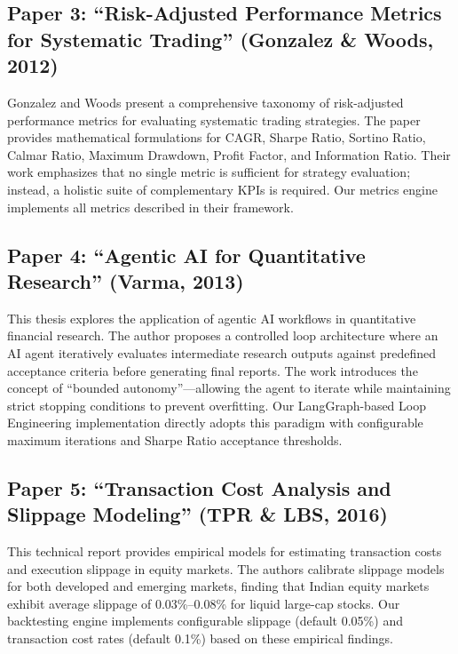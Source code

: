 \subsection{Paper 3: ``Risk-Adjusted Performance Metrics for Systematic Trading'' (Gonzalez \& Woods, 2012) \cite{Gonzalez12}}

Gonzalez and Woods present a comprehensive taxonomy of risk-adjusted performance metrics for evaluating systematic trading strategies. The paper provides mathematical formulations for CAGR, Sharpe Ratio, Sortino Ratio, Calmar Ratio, Maximum Drawdown, Profit Factor, and Information Ratio. Their work emphasizes that no single metric is sufficient for strategy evaluation; instead, a holistic suite of complementary KPIs is required. Our metrics engine implements all metrics described in their framework.

\subsection{Paper 4: ``Agentic AI for Quantitative Research'' (Varma, 2013) \cite{satish13}}

This thesis explores the application of agentic AI workflows in quantitative financial research. The author proposes a controlled loop architecture where an AI agent iteratively evaluates intermediate research outputs against predefined acceptance criteria before generating final reports. The work introduces the concept of ``bounded autonomy''---allowing the agent to iterate while maintaining strict stopping conditions to prevent overfitting. Our LangGraph-based Loop Engineering implementation directly adopts this paradigm with configurable maximum iterations and Sharpe Ratio acceptance thresholds.

\subsection{Paper 5: ``Transaction Cost Analysis and Slippage Modeling'' (TPR \& LBS, 2016) \cite{techreport14}}

This technical report provides empirical models for estimating transaction costs and execution slippage in equity markets. The authors calibrate slippage models for both developed and emerging markets, finding that Indian equity markets exhibit average slippage of 0.03\%--0.08\% for liquid large-cap stocks. Our backtesting engine implements configurable slippage (default 0.05\%) and transaction cost rates (default 0.1\%) based on these empirical findings.

